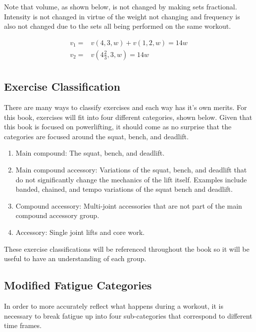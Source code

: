 Note that volume, as shown below, is not changed by making sets fractional. Intensity is not changed in virtue of the weight not changing and frequency is also not changed due to the sets all being performed on the same workout.

\begin{equation*}
    \begin{split}
        v_1=&v(4,3,w)+v(1,2,w)=14w \\
        v_2=&v\left(4\frac{2}{3},3,w\right)=14w \\
    \end{split}
\end{equation*}

\subsection{Exercise Classification}
\label{sec:ExerciseClassification}

There are many ways to classify exercises and each way has it's own merits. For this book, exercises will fit into four different categories, shown below. Given that this book is focused on powerlifting, it should come as no surprise that the categories are focused around the squat, bench, and deadlift.

\begin{enumerate}
	\item Main compound: The squat, bench, and deadlift.
	\item Main compound accessory: Variations of the squat, bench, and deadlift that do not significantly change the mechanics of the lift itself. Examples include banded, chained, and tempo variations of the squat bench and deadlift.
	\item Compound accessory: Multi-joint accessories that are not part of the main compound accessory group.
	\item Accessory: Single joint lifts and core work.
\end{enumerate}

These exercise classifications will be referenced throughout the book so it will be useful to have an understanding of each group.


\subsection{Modified Fatigue Categories}
\label{sec:ModifiedFatigueCategories}

In order to more accurately reflect what happens during a workout, it is necessary to break fatigue up into four sub-categories that correspond to different time frames.

